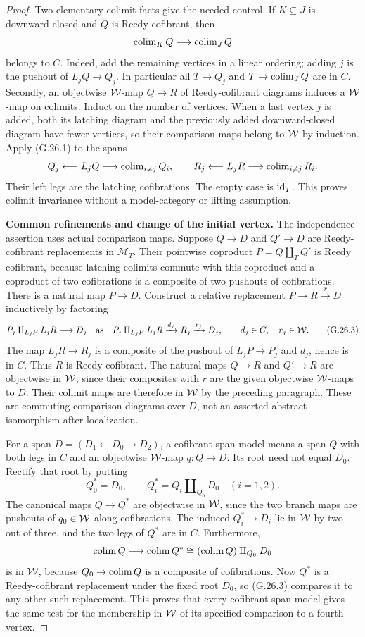 \begin{proof}
Two elementary colimit facts give the needed control. If $K\subseteq J$ is downward closed and $Q$ is Reedy cofibrant, then
\[
\operatorname{colim}_KQ\longrightarrow\operatorname{colim}_JQ
\]
belongs to $C$. Indeed, add the remaining vertices in a linear ordering; adding $j$ is the pushout of $L_jQ\to Q_j$. In particular all $T\to Q_j$ and $T\to\operatorname{colim}_JQ$ are in $C$. Secondly, an objectwise $\mathcal{W}$-map $Q\to R$ of Reedy-cofibrant diagrams induces a $\mathcal{W}$-map on colimits. Induct on the number of vertices. When a last vertex $j$ is added, both its latching diagram and the previously added downward-closed diagram have fewer vertices, so their comparison maps belong to $\mathcal{W}$ by induction. Apply (G.26.1) to the spans
\[
Q_j\longleftarrow L_jQ\longrightarrow\operatorname{colim}_{i\ne j}Q_i,
\qquad
R_j\longleftarrow L_jR\longrightarrow\operatorname{colim}_{i\ne j}R_i.
\]
Their left legs are the latching cofibrations. The empty case is $\mathrm{id}_T$. This proves colimit invariance without a model-category or lifting assumption.

\par\smallskip\noindent\textbf{Common refinements and change of the initial vertex.}\quad
The independence assertion uses actual comparison maps. Suppose $Q\to D$ and $Q'\to D$ are Reedy-cofibrant replacements in $\mathcal M_T$. Their pointwise coproduct $P=Q\amalg_TQ'$ is Reedy cofibrant, because latching colimits commute with this coproduct and a coproduct of two cofibrations is a composite of two pushouts of cofibrations. There is a natural map $P\to D$. Construct a relative replacement $P\to R\xrightarrow{r}D$ inductively by factoring
\[
P_j\amalg_{L_jP}L_jR
\longrightarrow D_j
\quad\text{as}\quad
P_j\amalg_{L_jP}L_jR\xrightarrow{d_j}R_j\xrightarrow{r_j}D_j,
\qquad d_j\in C,\quad r_j\in\mathcal{W}.                         \tag{G.26.3}
\]
The map $L_jR\to R_j$ is a composite of the pushout of $L_jP\to P_j$ and $d_j$, hence is in $C$. Thus $R$ is Reedy cofibrant. The natural maps $Q\to R$ and $Q'\to R$ are objectwise in $\mathcal{W}$, since their composites with $r$ are the given objectwise $\mathcal{W}$-maps to $D$. Their colimit maps are therefore in $\mathcal{W}$ by the preceding paragraph. These are commuting comparison diagrams over $D$, not an asserted abstract isomorphism after localization.

For a span $D=(D_1\leftarrow D_0\to D_2)$, a cofibrant span model means a span $Q$ with both legs in $C$ and an objectwise $\mathcal{W}$-map $q:Q\to D$. Its root need not equal $D_0$. Rectify that root by putting
\[
Q^*_0=D_0,\qquad Q^*_i=Q_i\amalg_{Q_0}D_0\quad(i=1,2).
                                                               \tag{G.26.4}
\]
The canonical maps $Q\to Q^*$ are objectwise in $\mathcal{W}$, since the two branch maps are pushouts of $q_0\in\mathcal{W}$ along cofibrations. The induced $Q_i^*\to D_i$ lie in $\mathcal{W}$ by two out of three, and the two legs of $Q^*$ are in $C$. Furthermore,
\[
\operatorname{colim} Q\longrightarrow\operatorname{colim} Q^*
\cong(\operatorname{colim} Q)\amalg_{Q_0}D_0
\]
is in $\mathcal{W}$, because $Q_0\to\operatorname{colim} Q$ is a composite of cofibrations. Now $Q^*$ is a Reedy-cofibrant replacement under the fixed root $D_0$, so (G.26.3) compares it to any other such replacement. This proves that every cofibrant span model gives the same test for the membership in $\mathcal{W}$ of its specified comparison to a fourth vertex.


\end{proof}
